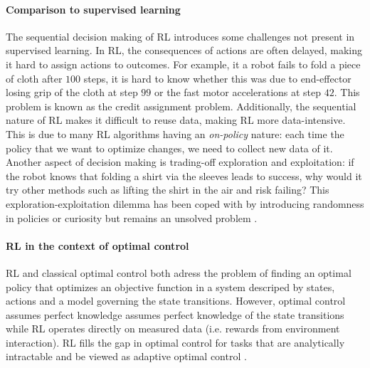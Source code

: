 \documentclass[\home/main.tex]{subfiles}
\begin{document}
\paragraph{Comparison to supervised learning}
The sequential decision making of RL introduces some challenges not present in supervised learning.
In RL, the consequences of actions are often delayed, making it hard to assign actions to outcomes. For example, it a robot fails to fold a piece of cloth after $100$ steps, it is hard to know whether this was due to end-effector losing grip of the cloth at step $99$ or the fast motor accelerations at step $42$. This problem is known as the credit assignment problem.
Additionally, the sequential nature of RL makes it difficult to reuse data, making RL more data-intensive. This is due to many RL algorithms having an \emph{on-policy} nature: each time the policy that we want to optimize changes, we need to collect new data of it.
Another aspect of decision making is trading-off exploration and exploitation: if the robot knows that folding a shirt via the sleeves leads to success, why would it try other methods such as lifting the shirt in the air and risk failing? This exploration-exploitation dilemma has been coped with by introducing randomness in policies or curiosity \autocite{pathak2017curiosity} but remains an unsolved problem \autocite{Sutton2018}.

\paragraph{RL in the context of optimal control}
\Gls{RL} and classical optimal control both adress the problem of finding an optimal policy that optimizes an objective function in a system descriped by states, actions and a model governing the state transitions. However, optimal control assumes perfect knowledge assumes perfect knowledge of the state transitions while RL operates directly on measured data (i.e. rewards from environment interaction). RL fills the gap in optimal control for tasks that are analytically intractable and be viewed as adaptive optimal control \autocite{sutton1992reinforcement}.
\end{document}
